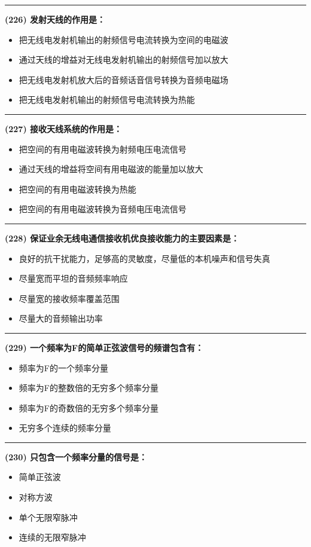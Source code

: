 \documentclass[twocolumn]{ctexart}  %
\begin{document}
\noindent\rule{0.5\textwidth}{1pt}
\heiti \textbf{(226) 发射天线的作用是：} \songti {\color{gray} [LK0420] }
\begin{itemize}
	\item  把无线电发射机输出的射频信号电流转换为空间的电磁波
	\item  通过天线的增益对无线电发射机输出的射频信号加以放大
	\item  把无线电发射机放大后的音频话音信号转换为音频电磁场
	\item  把无线电发射机输出的射频信号电流转换为热能
\end{itemize}


\noindent\rule{0.5\textwidth}{1pt}
\heiti \textbf{(227) 接收天线系统的作用是：} \songti {\color{gray} [LK0421] }
\begin{itemize}
	\item  把空间的有用电磁波转换为射频电压电流信号
	\item  通过天线的增益将空间有用电磁波的能量加以放大
	\item  把空间的有用电磁波转换为热能
	\item  把空间的有用电磁波转换为音频电压电流信号
\end{itemize}


\noindent\rule{0.5\textwidth}{1pt}
\heiti \textbf{(228) 保证业余无线电通信接收机优良接收能力的主要因素是：} \songti {\color{gray} [LK0422] }
\begin{itemize}
	\item  良好的抗干扰能力，足够高的灵敏度，尽量低的本机噪声和信号失真
	\item  尽量宽而平坦的音频频率响应
	\item  尽量宽的接收频率覆盖范围
	\item  尽量大的音频输出功率
\end{itemize}


\noindent\rule{0.5\textwidth}{1pt}
\heiti \textbf{(229) 一个频率为F的简单正弦波信号的频谱包含有：} \songti {\color{gray} [LK0533] }
\begin{itemize}
	\item  频率为F的一个频率分量
	\item  频率为F的整数倍的无穷多个频率分量
	\item  频率为F的奇数倍的无穷多个频率分量
	\item  无穷多个连续的频率分量
\end{itemize}


\noindent\rule{0.5\textwidth}{1pt}
\heiti \textbf{(230) 只包含一个频率分量的信号是：} \songti {\color{gray} [LK0535] }
\begin{itemize}
	\item  简单正弦波
	\item  对称方波
	\item  单个无限窄脉冲
	\item  连续的无限窄脉冲
\end{itemize}
\end{document}
